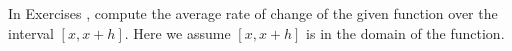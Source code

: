 {\noindent In Exercises}
{, compute the average rate of change of the given function over the interval $[x, x + h]$.  Here we assume $[x, x + h]$ is in the domain of the function.
}
